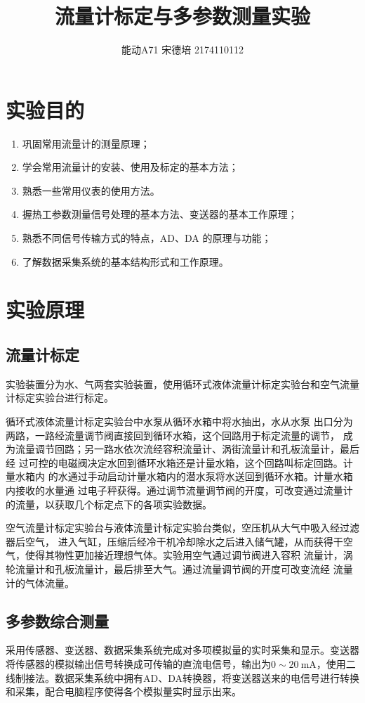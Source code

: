 \documentclass[UTF8]{article}
\title{流量计标定与多参数测量实验}
\author{能动A71 宋德培 2174110112}
\begin{document}
	\maketitle
	\section{实验目的}
	\begin{enumerate}
	\item  巩固常用流量计的测量原理；
	\item  学会常用流量计的安装、使用及标定的基本方法；
	\item  熟悉一些常用仪表的使用方法。
	\item 握热工参数测量信号处理的基本方法、变送器的基本工作原理；
	\item 熟悉不同信号传输方式的特点，AD、DA 的原理与功能；
	\item 了解数据采集系统的基本结构形式和工作原理。


	
	\end{enumerate}
	
	\section{实验原理}
	\subsection{流量计标定}
	实验装置分为水、气两套实验装置，使用循环式液体流量计标定实验台和空气流量计标定实验台进行标定。
	
	循环式液体流量计标定实验台中水泵从循环水箱中将水抽出，水从水泵
	出口分为两路，一路经流量调节阀直接回到循环水箱，这个回路用于标定流量的调节，
	成为流量调节回路；另一路水依次流经容积流量计、涡街流量计和孔板流量计，最后经
	过可控的电磁阀决定水回到循环水箱还是计量水箱，这个回路叫标定回路。计量水箱内
	的水通过手动启动计量水箱内的潜水泵将水送回到循环水箱。计量水箱内接收的水量通
	过电子秤获得。通过调节流量调节阀的开度，可改变通过流量计的流量，以获取几个标定点下的各项实验数据。
	
	空气流量计标定实验台与液体流量计标定实验台类似，空压机从大气中吸入经过滤器后空气，
	进入气缸，压缩后经冷干机冷却除水之后进入储气罐，从而获得干空气，使得其物性更加接近理想气体。实验用空气通过调节阀进入容积
	流量计，涡轮流量计和孔板流量计，最后排至大气。通过流量调节阀的开度可改变流经
	流量计的气体流量。
	\subsection{多参数综合测量}
	采用传感器、变送器、数据采集系统完成对多项模拟量的实时采集和显示。变送器将传感器的模拟输出信号转换成可传输的直流电信号，输出为$0\sim 20\ $mA，使用二线制接法。数据采集系统中拥有AD、DA转换器，将变送器送来的电信号进行转换和采集，配合电脑程序使得各个模拟量实时显示出来。
\end{document}
